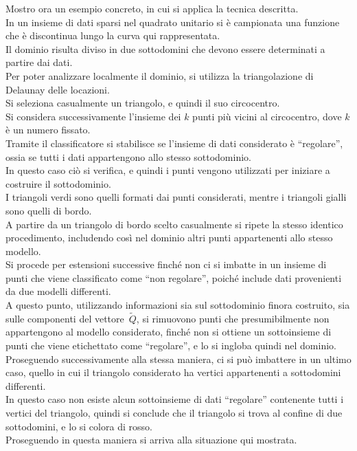 \rf Mostro ora un esempio concreto, in cui si applica la tecnica descritta.\\
In un insieme di dati sparsi nel quadrato unitario  si è campionata una funzione che è discontinua lungo la curva qui rappresentata.\\
Il dominio risulta diviso in due sottodomini che devono essere determinati a partire dai dati.\\
Per poter analizzare localmente il dominio, si utilizza la triangolazione di Delaunay delle locazioni.\\
Si seleziona casualmente un triangolo, e quindi il suo circocentro.\\
Si considera successivamente l’insieme dei $k$ punti più vicini al circocentro, dove $k$ è un numero  fissato.\\
Tramite il classificatore si stabilisce se l’insieme di dati considerato è “regolare”, ossia se tutti i dati appartengono allo stesso sottodominio.\\
In questo caso ciò si verifica, e quindi i punti vengono utilizzati per iniziare a costruire il sottodominio.\\
I triangoli verdi sono quelli formati dai punti considerati, mentre i triangoli gialli sono quelli di bordo.\\
A partire da un triangolo di bordo scelto casualmente si ripete la stesso identico procedimento, includendo così nel dominio altri punti appartenenti allo stesso modello.\\
Si procede per estensioni successive finché non ci si imbatte in un insieme di punti che viene classificato come “non regolare”, poiché include dati provenienti da due modelli differenti.\\
A questo punto, utilizzando informazioni sia sul sottodominio finora costruito, sia sulle componenti del vettore~$\tilde Q$, si rimuovono punti che presumibilmente non appartengono al modello considerato, finché non si ottiene un sottoinsieme di punti che viene etichettato come “regolare”, e lo si ingloba quindi nel dominio.\\
Proseguendo successivamente alla stessa maniera, ci si può imbattere in un ultimo caso, quello in cui il triangolo considerato ha vertici appartenenti  a sottodomini differenti.\\
In questo caso non esiste alcun sottoinsieme di dati “regolare” contenente tutti i vertici del triangolo, quindi si conclude che il triangolo si trova al confine di due sottodomini, e lo si colora di rosso.\\   
Proseguendo in questa maniera si arriva alla situazione qui mostrata.



